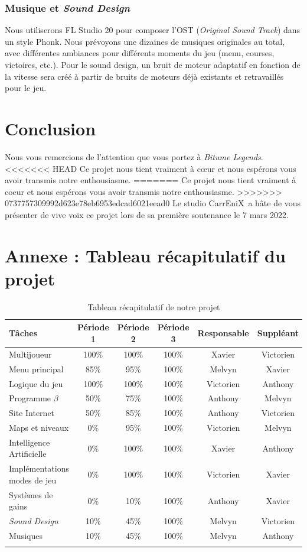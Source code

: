 \documentclass[12pt,a4paper]{article}
\newcommand{\btmlgs}{\textit{Bitume Legends}}
\newcommand{\AI}{Intelligence Artificielle}
\newcommand{\CEX}{CarrEniX}
\begin{document}
\subsubsection{Musique et \textit{Sound Design}}
Nous utiliserons FL Studio 20 pour composer l'OST (\textit{Original Sound Track}) dans un style Phonk.
Nous prévoyons une dizaines de musiques originales au total, avec différentes ambiances pour
différents moments du jeu (menu, courses, victoires, etc.). Pour le sound design, un bruit de 
moteur adaptatif en fonction de la vitesse sera créé à partir de bruits de moteurs déjà 
existants et retravaillés pour le jeu.
\clearpage

\section{Conclusion}
Nous vous remercions de l'attention que vous portez à \btmlgs.
<<<<<<< HEAD
Ce projet nous tient vraiment à cœur et nous espérons vous avoir transmis notre enthousiasme.
=======
Ce projet nous tient vraiment à coeur et nous espérons vous avoir transmis notre enthousiasme.
>>>>>>> 0737757309992d623e78eb6953edcad6021eead0
Le studio \CEX\, a hâte de vous présenter de vive voix ce projet lors de sa première soutenance le 7 mars 2022.


\section{Annexe : Tableau récapitulatif du projet}
\renewcommand{\arraystretch}{1.2}
\setlength{\LTleft}{-1cm plus 1 fill}
\setlength{\LTright}{-1cm plus 1 fill}
\begin{longtable}{| p{4.5cm} || c | c | c | c | c |}
    \hline
    Tâches & Période 1 & Période 2 & Période 3 & Responsable & Suppléant\\\hline\hline
    Multijoueur & 100\% & 100\% & 100\% & Xavier & Victorien \\\hline
    Menu principal & 85\% & 95\% & 100\% & Melvyn & Xavier \\\hline
    Logique du jeu & 100\% & 100\%  & 100\% & Victorien & Anthony\\\hline
    Programme \(\beta\) & 50\% & 75\% & 100\% & Anthony & Melvyn \\\hline
    Site Internet & 50\% & 85\%  & 100\% & Anthony & Victorien\\\hline
    Maps et niveaux & 0\% & 95\%  & 100\% & Victorien & Melvyn\\\hline
    \AI & 0\% & 100\%  & 100\% & Xavier & Anthony\\\hline
    Implémentations modes de jeu & 0\% & 100\%  & 100\% & Victorien & Xavier\\\hline
    Systèmes de gains & 0\% & 10\%  & 100\% & Anthony & Xavier\\\hline
    \textit{Sound Design} & 10\% & 45\% & 100\% & Melvyn & Victorien\\\hline
    Musiques & 10\% & 45\%  & 100\% & Melvyn & Anthony \\\hline
    \caption{Tableau récapitulatif de notre projet}
\end{longtable}
\end{document}
